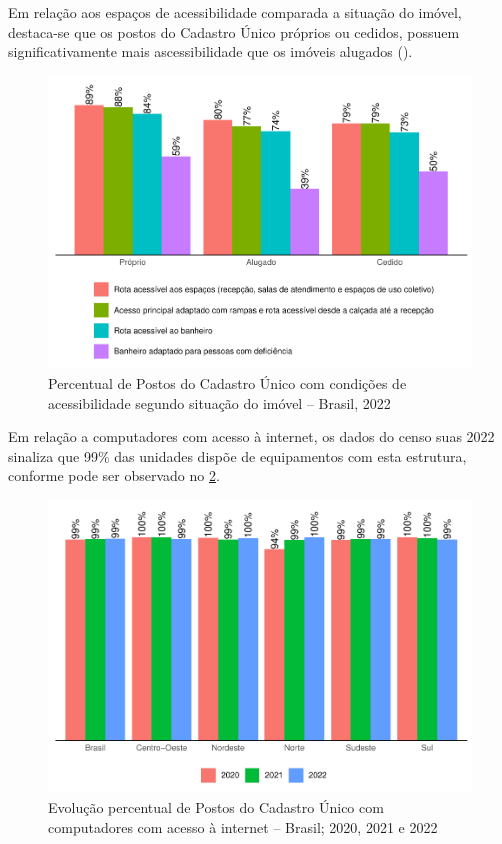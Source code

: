 \documentclass[
  brazilian]{report}
\begin{document}
Em relação aos espaços de acessibilidade comparada a situação do imóvel,
destaca-se que os postos do Cadastro Único próprios ou cedidos, possuem
significativamente mais ascessibilidade que os imóveis alugados
().

\begin{figure}
\includegraphics{Censo-SUAS-2022_files/figure-latex/postcad-acessibilidade-situacao-1} \caption[Percentual de Postos do Cadastro Único com condições de acessibilidade segundo situação do imóvel – Brasil, 2022]{Percentual de Postos do Cadastro Único com condições de acessibilidade segundo situação do imóvel – Brasil, 2022}\label{fig:postcad-acessibilidade-situacao}
\end{figure}

Em relação a computadores com acesso à internet, os dados do censo suas
2022 sinaliza que 99\% das unidades dispõe de equipamentos com esta
estrutura, conforme pode ser observado no
\cref{fig:postcad-internet-percentual}.

\begin{figure}
\includegraphics{Censo-SUAS-2022_files/figure-latex/postcad-internet-percentual-1} \caption[Evolução percentual de Postos do Cadastro Único com computadores com acesso à internet – Brasil]{Evolução percentual de Postos do Cadastro Único com computadores com acesso à internet – Brasil;  2020, 2021 e 2022}\label{fig:postcad-internet-percentual}
\end{figure}
\end{document}
